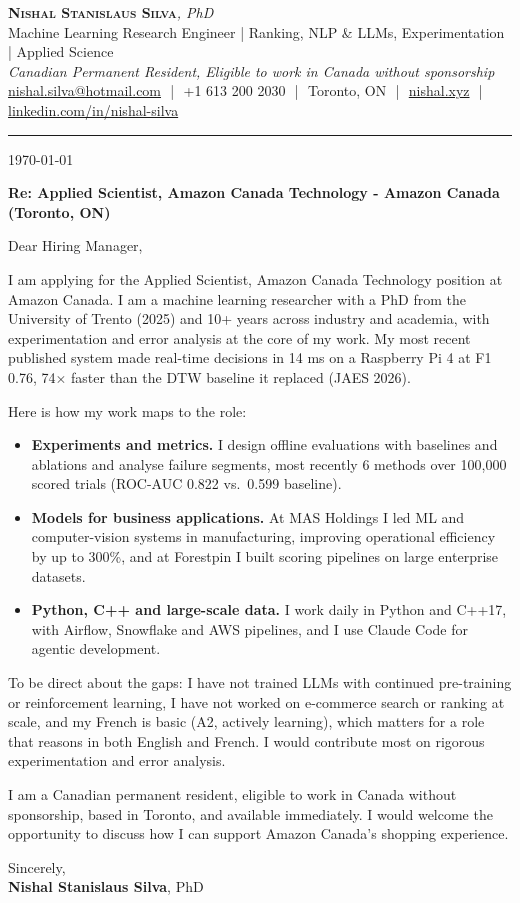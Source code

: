 \documentclass[11pt]{article}
\makeatletter
\newcommand{\clName}{Nishal Stanislaus Silva}
\newcommand{\clEmail}{nishal.silva@hotmail.com}
\newcommand{\clPhone}{+1 613 200 2030}
\newcommand{\clCity}{Toronto, ON}
\newcommand{\clSite}{https://nishal.xyz}
\newcommand{\clLinkedIn}{https://www.linkedin.com/in/nishal-silva}
\newcommand{\clStatus}{Canadian Permanent Resident, Eligible to work in Canada without sponsorship}
\newcommand{\clTagline}{Machine Learning Research Engineer | Ranking, NLP \& LLMs, Experimentation | Applied Science}
\newcommand{\clRole}{Applied Scientist, Amazon Canada Technology}
\newcommand{\clCompany}{Amazon Canada}
\newcommand{\clAddressee}{Dear Hiring Manager,}
\makeatother
\begin{document}
\pagestyle{empty}

\begin{center}
    {\LARGE \scshape \textbf{\clName}}{\large \textit{, PhD}}
    \\[1pt]
    {\small \clTagline}
    \\[1pt]
    {\footnotesize\textit{\clStatus}}
    \\[1pt]
    {\small
    \href{mailto:\clEmail}{\clEmail}
    \,\,|\,\, \clPhone
    \,\,|\,\, \clCity
    \,\,|\,\, \href{\clSite}{nishal.xyz}
    \,\,|\,\, \href{\clLinkedIn}{linkedin.com/in/nishal-silva}}
\end{center}

\rule{\linewidth}{0.4pt}\vspace{0.6em}

\today

\textbf{Re: \clRole{} - \clCompany{} (Toronto, ON)}

\clAddressee

I am applying for the \clRole{} position at \clCompany{}. I am a machine learning researcher with a PhD from the University of Trento (2025) and 10+ years across industry and academia, with experimentation and error analysis at the core of my work. My most recent published system made real-time decisions in 14 ms on a Raspberry Pi 4 at F1 0.76, 74$\times$ faster than the DTW baseline it replaced (JAES 2026).

Here is how my work maps to the role:
\begin{itemize}[leftmargin=1.4em, itemsep=0.1em, topsep=0.2em]
    \item \textbf{Experiments and metrics.} I design offline evaluations with baselines and ablations and analyse failure segments, most recently 6 methods over 100,000 scored trials (ROC-AUC 0.822 vs.\ 0.599 baseline).
    \item \textbf{Models for business applications.} At MAS Holdings I led ML and computer-vision systems in manufacturing, improving operational efficiency by up to 300\%, and at Forestpin I built scoring pipelines on large enterprise datasets.
    \item \textbf{Python, C++ and large-scale data.} I work daily in Python and C++17, with Airflow, Snowflake and AWS pipelines, and I use Claude Code for agentic development.
\end{itemize}
To be direct about the gaps: I have not trained LLMs with continued pre-training or reinforcement learning, I have not worked on e-commerce search or ranking at scale, and my French is basic (A2, actively learning), which matters for a role that reasons in both English and French. I would contribute most on rigorous experimentation and error analysis.

I am a Canadian permanent resident, eligible to work in Canada without sponsorship, based in Toronto, and available immediately. I would welcome the opportunity to discuss how I can support \clCompany{}'s shopping experience.

\vspace{8pt}
Sincerely,\\[2pt]
\textbf{\clName}, PhD
\end{document}
